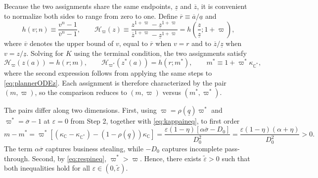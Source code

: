 Because the two assignments share the same endpoints, $\underline{z}$ and $\overline{z}$, it is convenient to normalize both sides to range from zero to one. Define $\overline{r} \equiv \overline{a}/\underline{a}$ and
%
\begin{equation}\label{eq:hassign2}
    h(v;n) \equiv \frac{v^{n} - 1}{\overline{v}^{n} - 1}, \qquad \mathcal{H}_{\varpi}(z) \equiv \frac{z^{1+\varpi} - \underline{z}^{1+\varpi}}{\overline{z}^{1+\varpi} - \underline{z}^{1+\varpi}} = h\left(\frac{z}{\underline{z}}; 1 + \varpi\right),
\end{equation}
%
where $\overline{v}$ denotes the upper bound of $v$, equal to $\overline{r}$ when $v=r$ and to $\overline{z}/\underline{z}$ when $v=z/\underline{z}$. Solving for $K$ using the terminal condition, the two assignments satisfy
%
\begin{equation*}
    \mathcal{H}_{\varpi}\left(z(a)\right) = h(r;m), \qquad \mathcal{H}_{\varpi^*}\left(z^*(a)\right) = h(r;m^*), \qquad m^* \equiv 1 + \varpi^* \kappa_{\mathbb{C}^*},
\end{equation*}
%
where the second expression follows from applying the same steps to \eqref{eq:plannerODEz}. Each assignment is therefore characterized by the pair $(m,\varpi)$, so the comparison reduces to $(m,\varpi)$ versus $(m^*,\varpi^*)$.

The pairs differ along two dimensions. First, using $\varpi = \rho(\underline{q}) \varpi^*$ and $\varpi^* = \overline{\sigma} - 1$ at $\varepsilon = 0$ from Step 2, together with \eqref{eq:kappaineq}, to first order
%
\begin{equation*}
    m - m^* = \varpi^* \left[\left(\kappa_{\mathbb{C}} - \kappa_{\mathbb{C}^*}\right) - \left(1 - \rho(\underline{q})\right) \kappa_{\mathbb{C}} \right] = \frac{\varepsilon (1-\eta)\left[\alpha \overline{\sigma} - D_0\right]}{D_0^2} = \frac{\varepsilon (1-\eta)(\alpha + \eta)}{D_0^2} > 0.
\end{equation*}
%
The term $\alpha \overline{\sigma}$ captures business stealing, while $-D_0$ captures incomplete pass-through. Second, by \eqref{eq:respineq}, $\varpi^* > \varpi$. Hence, there exists $\widetilde{\varepsilon} > 0$ such that both inequalities hold for all $\varepsilon \in (0, \widetilde{\varepsilon})$.


